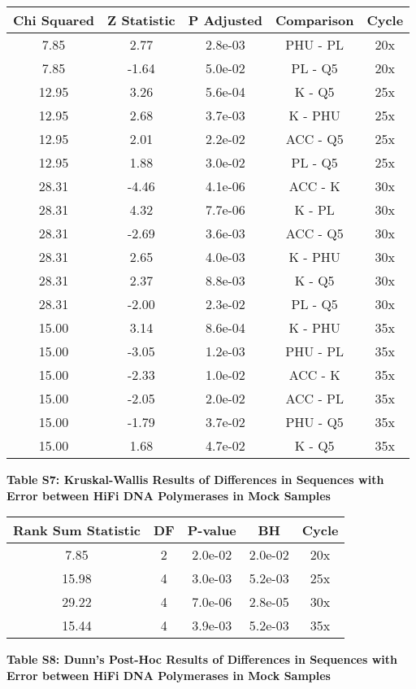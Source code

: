 \documentclass[12pt,]{article}
\begin{document}
\begin{longtable}[]{@{}ccccc@{}}
\toprule
Chi Squared & Z Statistic & P Adjusted & Comparison &
Cycle\tabularnewline
\midrule
\endhead
7.85 & 2.77 & 2.8e-03 & PHU - PL & 20x\tabularnewline
7.85 & -1.64 & 5.0e-02 & PL - Q5 & 20x\tabularnewline
12.95 & 3.26 & 5.6e-04 & K - Q5 & 25x\tabularnewline
12.95 & 2.68 & 3.7e-03 & K - PHU & 25x\tabularnewline
12.95 & 2.01 & 2.2e-02 & ACC - Q5 & 25x\tabularnewline
12.95 & 1.88 & 3.0e-02 & PL - Q5 & 25x\tabularnewline
28.31 & -4.46 & 4.1e-06 & ACC - K & 30x\tabularnewline
28.31 & 4.32 & 7.7e-06 & K - PL & 30x\tabularnewline
28.31 & -2.69 & 3.6e-03 & ACC - Q5 & 30x\tabularnewline
28.31 & 2.65 & 4.0e-03 & K - PHU & 30x\tabularnewline
28.31 & 2.37 & 8.8e-03 & K - Q5 & 30x\tabularnewline
28.31 & -2.00 & 2.3e-02 & PL - Q5 & 30x\tabularnewline
15.00 & 3.14 & 8.6e-04 & K - PHU & 35x\tabularnewline
15.00 & -3.05 & 1.2e-03 & PHU - PL & 35x\tabularnewline
15.00 & -2.33 & 1.0e-02 & ACC - K & 35x\tabularnewline
15.00 & -2.05 & 2.0e-02 & ACC - PL & 35x\tabularnewline
15.00 & -1.79 & 3.7e-02 & PHU - Q5 & 35x\tabularnewline
15.00 & 1.68 & 4.7e-02 & K - Q5 & 35x\tabularnewline
\bottomrule
\end{longtable}

\newpage

\textbf{Table S7: Kruskal-Wallis Results of Differences in Sequences
with Error between HiFi DNA Polymerases in Mock Samples}

\begin{longtable}[]{@{}ccccc@{}}
\toprule
Rank Sum Statistic & DF & P-value & BH & Cycle\tabularnewline
\midrule
\endhead
7.85 & 2 & 2.0e-02 & 2.0e-02 & 20x\tabularnewline
15.98 & 4 & 3.0e-03 & 5.2e-03 & 25x\tabularnewline
29.22 & 4 & 7.0e-06 & 2.8e-05 & 30x\tabularnewline
15.44 & 4 & 3.9e-03 & 5.2e-03 & 35x\tabularnewline
\bottomrule
\end{longtable}

\newpage

\textbf{Table S8: Dunn's Post-Hoc Results of Differences in Sequences
with Error between HiFi DNA Polymerases in Mock Samples}
\end{document}
